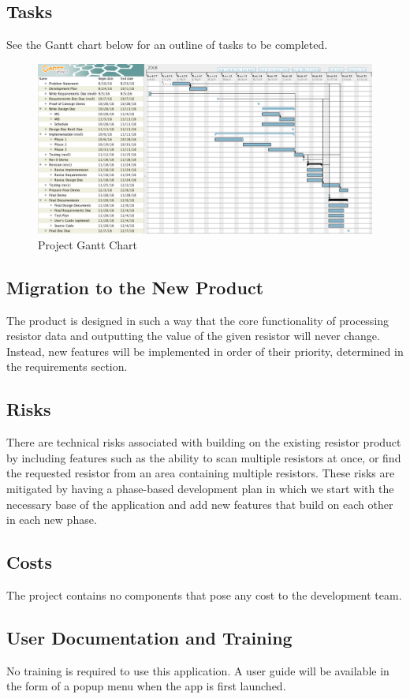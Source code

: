 \documentclass{article}
\begin{document}
\subsection{Tasks}
See the Gantt chart below for an outline of tasks to be completed.
\begin{figure}[h]
\centering
\includegraphics[scale=0.3]{gantt}
\caption{Project Gantt Chart}
\end{figure}

\subsection{Migration to the New Product}
The product is designed in such a way that the core functionality of processing resistor data and outputting the value of the given resistor will never change. Instead, new features will be implemented in order of their priority, determined in the requirements section.

\subsection{Risks}
There are technical risks associated with building on the existing resistor product by including features such as the ability to scan multiple resistors at once, or find the requested resistor from an area containing multiple resistors. These risks are mitigated by having a phase-based development plan in which we start with the necessary base of the application and add new features that build on each other in each new phase.

\subsection{Costs}
The project contains no components that pose any cost to the development team.

\subsection{User Documentation and Training}
No training is required to use this application. A user guide will be available in the form of a popup menu when the app is first launched.
\end{document}
